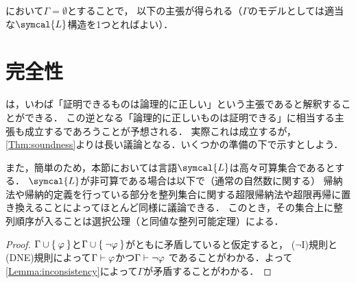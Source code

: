 において\(\Gamma = \emptyset\)とすることで，
以下の主張が得られる（\(\Gamma\)のモデルとしては適当な\(\symcal{L}\)構造を1つとればよい）．


\section{完全性} \label{sec:completeness}

は，いわば「証明できるものは論理的に正しい」という主張であると解釈することができる．
この逆となる「論理的に正しいものは証明できる」に相当する主張も成立するであろうことが予想される．
実際これは成立するが，\cref{Thm:soundness}よりは長い議論となる．いくつかの準備の下で示すとしよう．

また，簡単のため，本節においては言語\(\symcal{L}\)は高々可算集合であるとする．
\(\symcal{L}\)が非可算である場合は以下で（通常の自然数に関する）
帰納法や帰納的定義を行っている部分を整列集合に関する超限帰納法や超限再帰に置き換えることによってほとんど同様に議論できる．
このとき，その集合上に整列順序が入ることは選択公理（と同値な整列可能定理）による．


\begin{proof}
	\(\Gamma \cup \Set{\varphi}\)と\(\Gamma \cup \Set{\lnot \varphi}\)がともに矛盾していると仮定すると，
	(\(\lnot\)I)規則と(DNE)規則によって\(\Gamma \vdash \varphi\)かつ\(\Gamma \vdash \lnot \varphi\)
	であることがわかる．よって\cref{Lemma:inconsistency}によって\(\Gamma\)が矛盾することがわかる．
\end{proof}


